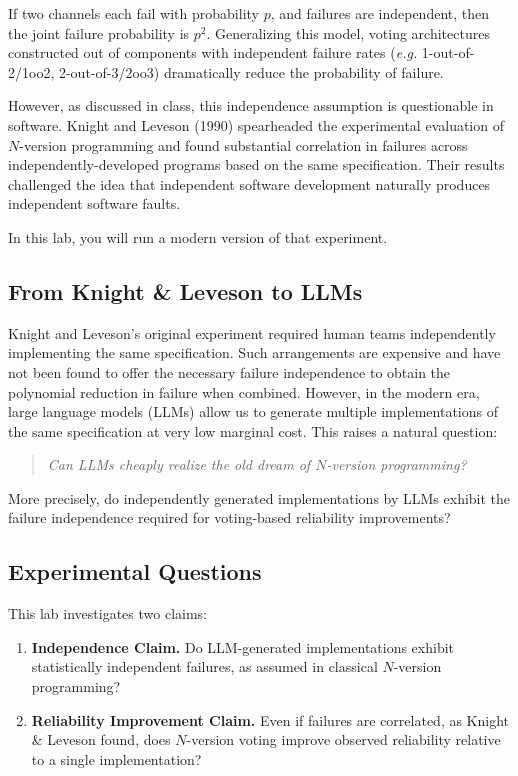 \documentclass[manuscript,screen,nonacm]{acmart}
\makeatletter
\newcommand{\eg}{\textit{e.g.}\@\xspace}
\makeatother
\begin{document}
If two channels each fail with probability $p$, and failures are independent, then the joint failure probability is $p^2$.
Generalizing this model, voting architectures constructed out of components with independent failure rates (\eg 1-out-of-2/1oo2, 2-out-of-3/2oo3) dramatically reduce the probability of failure.

However, as discussed in class, this independence assumption is questionable in software.
Knight and Leveson (1990) spearheaded the experimental evaluation of $N$-version programming and found substantial correlation in failures across independently-developed programs based on the same specification.
Their results challenged the idea that independent software development naturally produces independent software faults.

In this lab, you will run a modern version of that experiment.

\subsection{From Knight \& Leveson to LLMs}

Knight and Leveson’s original experiment required human teams independently implementing the same specification.
Such arrangements are expensive and have not been found to offer the necessary failure independence to obtain the polynomial reduction in failure when combined.
However, in the modern era, large language models (LLMs) allow us to generate multiple implementations of the same specification at very low marginal cost.
This raises a natural question:

\begin{quote}
\textit{Can LLMs cheaply realize the old dream of $N$-version programming?}
\end{quote}

More precisely, do independently generated implementations by LLMs exhibit the failure independence required for voting-based reliability improvements?

\subsection{Experimental Questions}

This lab investigates two claims:

\begin{enumerate}
  \item \textbf{Independence Claim.} 
  Do LLM-generated implementations exhibit statistically independent failures, as assumed in classical $N$-version programming?

  \item \textbf{Reliability Improvement Claim.}
  Even if failures are correlated, as Knight \& Leveson found, does $N$-version voting improve observed reliability relative to a single implementation?
\end{enumerate}
\end{document}
